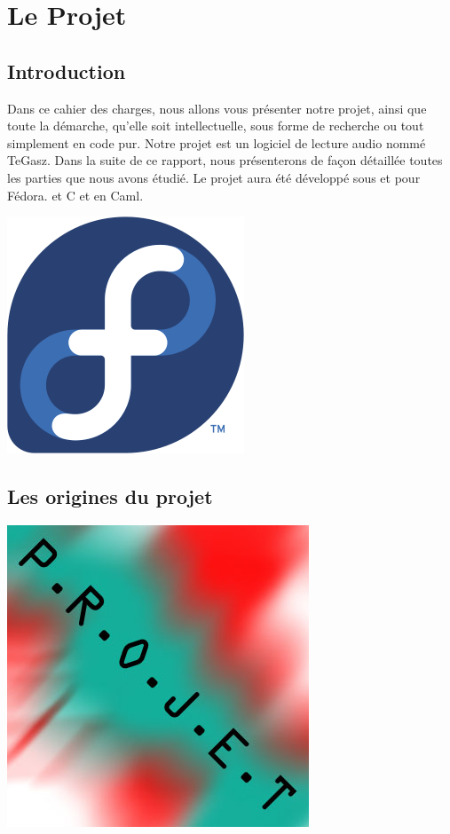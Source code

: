 \documentclass[12pt]{report}
\begin{document}
\tableofcontents

\chapter{Le Projet}
	\section{Introduction}
Dans ce cahier des charges, nous allons vous présenter notre projet, ainsi que toute la démarche, qu'elle soit intellectuelle, sous forme de recherche ou tout simplement en code pur.
Notre projet est un logiciel de lecture audio nommé TeGasz. Dans la suite de ce rapport, nous présenterons de façon détaillée toutes les parties que nous avons étudié. Le projet aura été développé sous et pour Fédora. et C et en Caml.

\begin{center}
\includegraphics[scale = 0.2]{logo_fedo.png}
\end{center}

	\section{Les origines du projet}

\begin{center}
\includegraphics[scale= 0.3]{./name.jpg}\\[1cm]  
\end{center}
\end{document}
